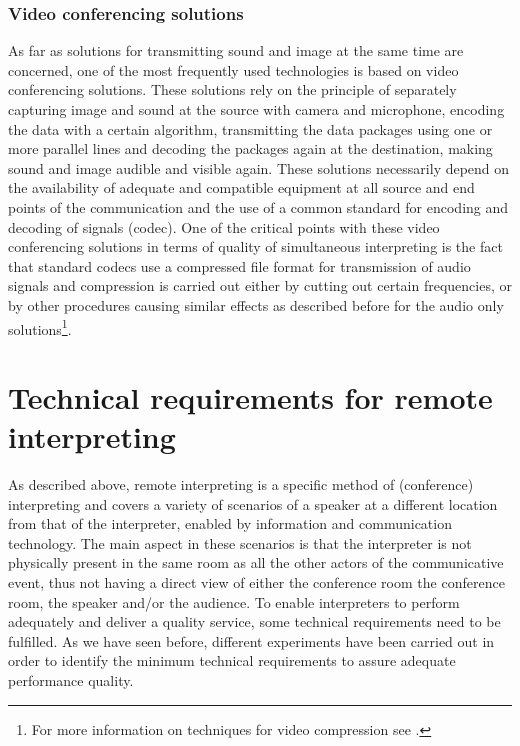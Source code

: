 \documentclass[output=paper]{langsci/langscibook}
\begin{document}
\subsubsection{Video conferencing solutions}
\label{sub:ziegler:4.4}
As far as solutions for transmitting sound and image at the same time are concerned, one of the most frequently used technologies is based on video conferencing solutions. These solutions rely on the principle of separately capturing image and sound at the source with camera and microphone, encoding the data with a certain algorithm, transmitting the data packages using one or more parallel lines and decoding the packages again at the destination, making sound and image audible and visible again. These solutions necessarily depend on the availability of adequate and compatible equipment at all source and end points of the communication and the use of a common standard for encoding and decoding of signals (codec). One of the critical points with these video conferencing solutions in terms of quality of simultaneous interpreting is the fact that standard codecs use a compressed file format for transmission of audio signals and compression is carried out either by cutting out certain frequencies, or by other procedures causing similar effects as described before for the audio only solutions\footnote{For more information on techniques for video compression see \citet{Wiegand2003}.}.

\section{Technical requirements for remote interpreting}
\label{sec:ziegler:05}
As described above, remote interpreting is a specific method of (conference) interpreting and covers a variety of scenarios of a speaker at a different location from that of the interpreter, enabled by information and communication technology. The main aspect in these scenarios is that the interpreter is not physically present in the same room as all the other actors of the communicative event, thus not having a direct view of either the conference room the conference room, the speaker and/or the audience. To enable interpreters to perform adequately and deliver a quality service, some technical requirements need to be fulfilled. As we have seen before, different experiments have been carried out in order to identify the minimum technical requirements to assure adequate performance quality.
\end{document}
